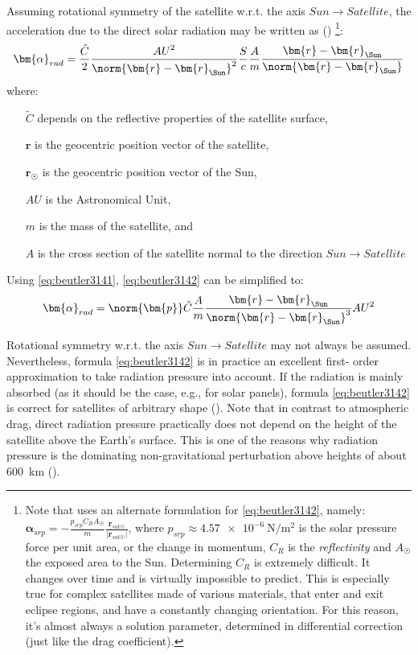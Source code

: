Assuming rotational symmetry of the satellite w.r.t. the axis \(Sun \to Satellite\), 
the acceleration due to the direct solar radiation may be written as (\cite{BeutlerVII})
\footnote{Note that \cite{Vallado} uses an alternate formulation for \ref{eq:beutler3142}, 
namely: 
\( \bm{\alpha}_{srp} =  - \frac{p_{srp} C_R A_{\Sun}}{m} \frac{\bm{r}_{sat\Sun}}{\lvert \bm{r}_{sat\Sun} \rvert} \), 
where \(p_{srp} \approx \SI{4.57e-6}{\N\per\square\m}\) is the solar pressure force 
per unit area, or the change in momentum, \(C_R\) is the \emph{reflectivity} and 
\(A_{\Sun}\) the exposed area to the Sun. Determining \(C_R\) is extremely
difficult. It changes over time and is virtually impossible to predict. This is especially
true for complex satellites made of various materials, that enter and exit eclipse regions,
and have a constantly changing orientation. For this reason, it's almost always a solution
parameter, determined in differential correction (just like the drag coefficient).}:
\begin{equation}
    \label{eq:beutler3142}
    \bm{\alpha}_{rad} = \frac{\tilde{C}}{2} 
    \frac{{AU}^2}{{\norm{\bm{r} - \bm{r}_{\Sun}}}^2}
    \frac{S}{c} \frac{A}{m}
    \frac{\bm{r} - \bm{r}_{\Sun}}{\norm{\bm{r} - \bm{r}_{\Sun}}}
\end{equation}
where:
\begin{itemize}
\item[\(\tilde{C}\)] depends on the reﬂective properties of the satellite surface,
\item[\(\bm{r}\)] is the geocentric position vector of the satellite,
\item[\(\bm{r_{\Sun}}\)] is the geocentric position vector of the Sun,
\item[\(AU\)] is the Astronomical Unit,
\item[\(m\)] is the mass of the satellite, and
\item[\(A\)] is the cross section of the satellite normal to the direction \(Sun \to Satellite\)
\end{itemize}

Using \ref{eq:beutler3141}, \ref{eq:beutler3142} can be simplified to:
\begin{equation}
  \label{eq:mont375}
  \bm{\alpha}_{rad} = \norm{\bm{p}} \tilde{C} \frac{A}{m} \frac{\bm{r} - \bm{r}_{\Sun}}{\norm{\bm{r} - \bm{r}_{\Sun}} ^3} {AU}^2
\end{equation}

Rotational symmetry w.r.t. the axis \(Sun \to Satellite\) may not always
be assumed. Nevertheless, formula \ref{eq:beutler3142} is in practice an excellent ﬁrst-
order approximation to take radiation pressure into account. If the radiation
is mainly absorbed (as it should be the case, e.g., for solar panels), formula 
\ref{eq:beutler3142} is correct for satellites of arbitrary shape (\cite{BeutlerVII}).
Note that in contrast to atmospheric drag, direct radiation pressure practically does 
not depend on the height of the satellite above the Earth's surface. This is one of 
the reasons why radiation pressure is the dominating non-gravitational perturbation 
above heights of about \SI{600}{\km} (\cite{BeutlerVII}).

